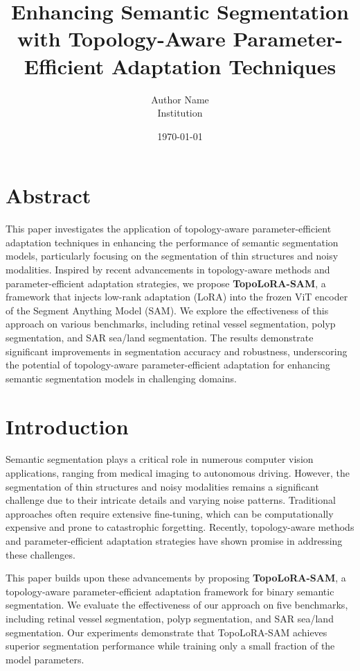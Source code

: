 \documentclass{article}
\title{Enhancing Semantic Segmentation with Topology-Aware Parameter-Efficient Adaptation Techniques}
\author{Author Name \\ Institution}
\date{\today}
\begin{document}
\maketitle

\section*{Abstract}
This paper investigates the application of topology-aware parameter-efficient adaptation techniques in enhancing the performance of semantic segmentation models, particularly focusing on the segmentation of thin structures and noisy modalities. Inspired by recent advancements in topology-aware methods and parameter-efficient adaptation strategies, we propose \textbf{TopoLoRA-SAM}, a framework that injects low-rank adaptation (LoRA) into the frozen ViT encoder of the Segment Anything Model (SAM). We explore the effectiveness of this approach on various benchmarks, including retinal vessel segmentation, polyp segmentation, and SAR sea/land segmentation. The results demonstrate significant improvements in segmentation accuracy and robustness, underscoring the potential of topology-aware parameter-efficient adaptation for enhancing semantic segmentation models in challenging domains.

\section*{Introduction}
Semantic segmentation plays a critical role in numerous computer vision applications, ranging from medical imaging to autonomous driving. However, the segmentation of thin structures and noisy modalities remains a significant challenge due to their intricate details and varying noise patterns. Traditional approaches often require extensive fine-tuning, which can be computationally expensive and prone to catastrophic forgetting. Recently, topology-aware methods and parameter-efficient adaptation strategies have shown promise in addressing these challenges.

This paper builds upon these advancements by proposing \textbf{TopoLoRA-SAM}, a topology-aware parameter-efficient adaptation framework for binary semantic segmentation. We evaluate the effectiveness of our approach on five benchmarks, including retinal vessel segmentation, polyp segmentation, and SAR sea/land segmentation. Our experiments demonstrate that TopoLoRA-SAM achieves superior segmentation performance while training only a small fraction of the model parameters.
\end{document}
